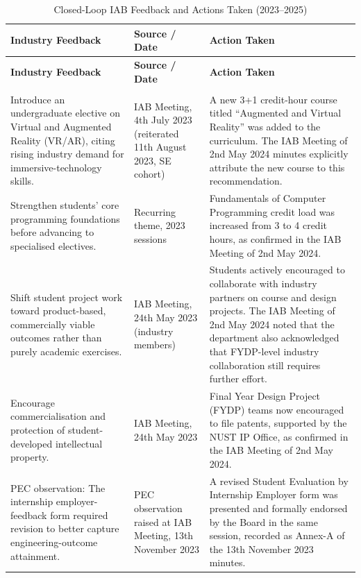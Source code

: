 \begingroup
\footnotesize
\setlength{\tabcolsep}{4pt}
\renewcommand{\arraystretch}{1.2}
\begin{longtable}[]{@{}>{\raggedright\arraybackslash}p{}>{\raggedright\arraybackslash}p{}>{\raggedright\arraybackslash}p{}@{}}
\caption{Closed-Loop IAB Feedback and Actions Taken (2023--2025)}\label{tab:iab_closed_loop}\\
\toprule
\textbf{Industry Feedback} & \textbf{Source / Date} & \textbf{Action Taken}\\
\midrule
\endfirsthead
\toprule
\textbf{Industry Feedback} & \textbf{Source / Date} & \textbf{Action Taken}\\
\midrule
\endhead
\midrule
\multicolumn{3}{r}{\footnotesize\itshape Continued on next page}\\
\endfoot
\bottomrule
\endlastfoot
Introduce an undergraduate elective on Virtual and Augmented Reality (VR/AR), citing rising industry demand for immersive-technology skills. & IAB Meeting, 4th July 2023 (reiterated 11th August 2023, SE cohort) & A new 3+1 credit-hour course titled ``Augmented and Virtual Reality'' was added to the curriculum. The IAB Meeting of 2nd May 2024 minutes explicitly attribute the new course to this recommendation.\\
\addlinespace
Strengthen students' core programming foundations before advancing to specialised electives. & Recurring theme, 2023 sessions & Fundamentals of Computer Programming credit load was increased from 3 to 4 credit hours, as confirmed in the IAB Meeting of 2nd May 2024.\\
\addlinespace
Shift student project work toward product-based, commercially viable outcomes rather than purely academic exercises. & IAB Meeting, 24th May 2023 (industry members) & Students actively encouraged to collaborate with industry partners on course and design projects. The IAB Meeting of 2nd May 2024 noted that the department also acknowledged that FYDP-level industry collaboration still requires further effort.\\
\addlinespace
Encourage commercialisation and protection of student-developed intellectual property. & IAB Meeting, 24th May 2023 & Final Year Design Project (FYDP) teams now encouraged to file patents, supported by the NUST IP Office, as confirmed in the IAB Meeting of 2nd May 2024.\\
\addlinespace
PEC observation: The internship employer-feedback form required revision to better capture engineering-outcome attainment. & PEC observation raised at IAB Meeting, 13th November 2023 & A revised Student Evaluation by Internship Employer form was presented and formally endorsed by the Board in the same session, recorded as Annex-A of the 13th November 2023 minutes.\\

\end{longtable}
